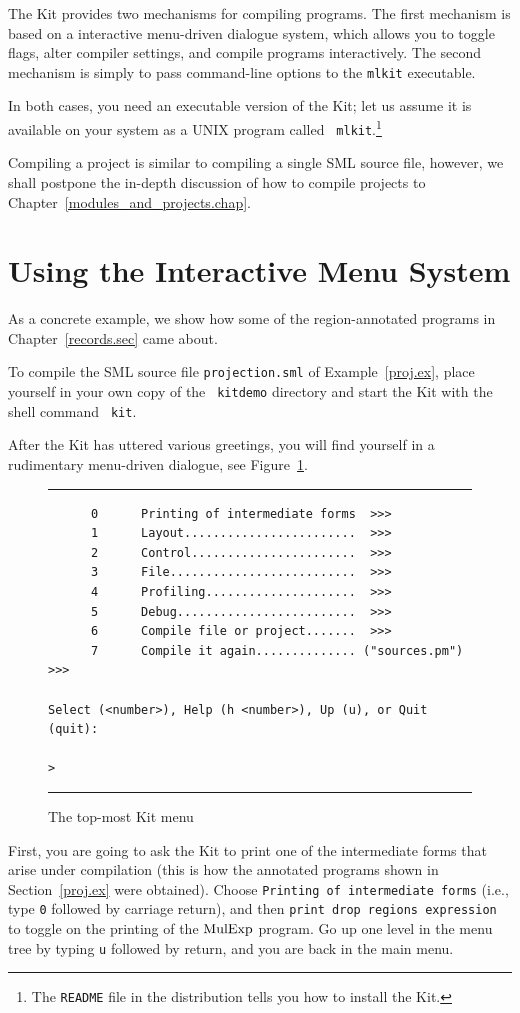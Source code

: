 \documentclass[12pt]{book}
\begin{document}
The Kit provides two mechanisms for compiling programs. The first
mechanism is based on a
%
interactive menu-driven dialogue system, which allows you to toggle
flags, alter compiler settings, and compile programs interactively.
The second mechanism is simply to pass
%
command-line options to the {\tt mlkit} executable.

In both cases, you need an executable version of the Kit; let us
assume it is available on your system as a UNIX program called {\tt
  mlkit}.\footnote{The {\tt README} file in the distribution tells you
  how to install the Kit.}

Compiling a project is similar to compiling a single SML source file,
however, we shall postpone the in-depth discussion of how to compile
projects to Chapter~\ref{modules_and_projects.chap}.

\section{Using the Interactive Menu System}

As a concrete example, we show how some of the region-annotated
programs in Chapter~\ref{records.sec} came about.

To compile the SML source file {\tt projection.sml} of
Example~\ref{proj.ex}, place yourself in your own copy of the {\tt
  kitdemo} directory and start the Kit with the shell command {\tt
  kit}.

After the Kit has uttered various greetings, you will find yourself in
a rudimentary menu-driven dialogue, see Figure~\ref{dialogue.fig}.
\begin{figure}
\hrule \medskip
\begin{verbatim}
      0      Printing of intermediate forms  >>>
      1      Layout........................  >>>
      2      Control.......................  >>>
      3      File..........................  >>>
      4      Profiling.....................  >>>
      5      Debug.........................  >>>
      6      Compile file or project.......  >>>
      7      Compile it again.............. ("sources.pm") >>>

Select (<number>), Help (h <number>), Up (u), or Quit (quit): 

>
\end{verbatim}
\caption{The top-most Kit menu}
\medskip \hrule 
\label{dialogue.fig}
\end{figure}
First, you are going to ask the Kit to print one of the intermediate
forms that arise under compilation (this is how the annotated programs
shown in  Section~\ref{proj.ex} were obtained). 
Choose \texttt{Printing of intermediate forms} (i.e., type \texttt{0}
followed by carriage return), and then \texttt{print drop regions
expression} to toggle on the printing of the $\hbox{\rm MulExp}$ program.
Go up one level in the menu tree by typing \texttt{u} followed by return,
and you are back in the main menu.
\end{document}

